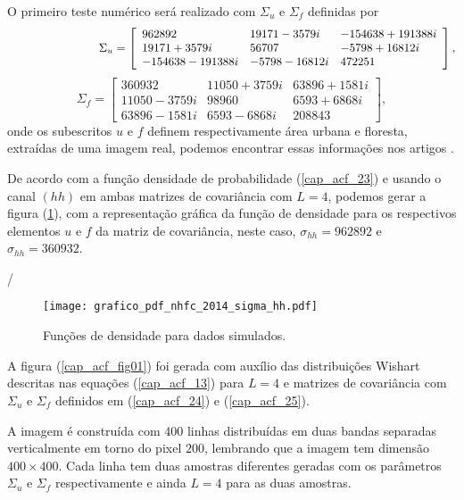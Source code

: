 O primeiro teste numérico será realizado com $\Sigma_u$ e $\Sigma_f$ definidas por
\begin{equation}\label{matriz_sigma_nhfc_1}
	\hspace{2.75cm} \Sigma_{u}= \left[
\begin{array}{lll}
	962892             &19171 - 3579i&     -154638 + 191388i \\
	19171 + 3579i      &56707        &     -5798 + 16812i  \\
	-154638 - 191388i  &-5798 - 16812i&      472251 
\end{array}
\right],
\end{equation}
\begin{equation}\label{matriz_sigma_nhfc_2}
 \Sigma_{f}= \left[
\begin{array}{lll}
	360932            & 11050 + 3759i&   63896 + 1581i \\
	11050 - 3759i     & 98960       &   6593 + 6868i \\
	63896  - 1581i    & 6593  - 6868i&   208843
\end{array}
\right],
\end{equation}
onde os subescritos $u$ e $f$ definem respectivamente área urbana e floresta, extraídas de uma imagem real, podemos encontrar essas informações nos artigos \citep{fbgm, nhfc}.

De acordo com a função densidade de probabilidade (\ref{cap_acf_23}) e usando o canal $(hh)$ em ambas matrizes de covariância com $L=4$, podemos gerar a figura (\ref{cap_acf_fig02}), com a representação gráfica da função de densidade para os respectivos elementos $u$ e $f$ da matriz de covariância, neste caso, $\sigma_{hh}=962892$ e $\sigma_{hh}= 360932$. 

/\begin{figure}[hbt]
	\centering
  \texttt{[image: grafico\_pdf\_nhfc\_2014\_sigma\_hh.pdf]}
	\caption{Funções de densidade para dados simulados.}\label{cap_acf_fig02}
\end{figure}

A figura (\ref{cap_acf_fig01}) foi gerada com auxílio das distribuições Wishart descritas nas equações (\ref{cap_acf_13}) para $L=4$ e matrizes de covariância com $\Sigma_{u}$ e $\Sigma_{f}$ definidos em (\ref{cap_acf_24}) e (\ref{cap_acf_25}).

	
A imagem é construída com $400$ linhas distribuídas em duas bandas separadas verticalmente em torno do pixel $200$, lembrando que a imagem tem dimensão $400 \times 400$. Cada linha  tem duas amostras diferentes geradas com os parâmetros $\Sigma_{u}$ e $\Sigma_{f}$ respectivamente e ainda $L=4$ para as duas amostras.  

